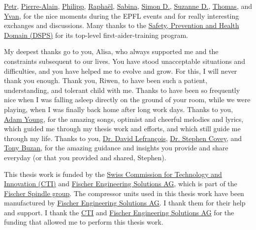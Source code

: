 \href{http://people.epfl.ch/petr.grivaz}{Petr},
\href{https://ch.linkedin.com/pub/pierre-alain-pascal/2a/a58/890/en}{Pierre-Alain},
\href{http://people.epfl.ch/philipp.clausen}{Philipp},
\href{https://ch.linkedin.com/in/rgindrat/en}{Raphaël},
\href{https://ch.linkedin.com/pub/sabina-schneider/b2/2ba/538}{Sabina},
\href{http://people.epfl.ch/simon.doppler}{Simon D.},
\href{https://ch.linkedin.com/pub/suzanne-dubsky/84/a58/555/en}{Suzanne
  D.}, \href{https://sg.linkedin.com/in/thomascibils/en}{Thomas}, and
\href{https://ch.linkedin.com/pub/yvan-deillon/2a/b5a/382/en}{Yvan},
for the nice moments during the EPFL events and for really interesting
exchanges and discussions. Many thanks to the
\href{http://securite.epfl.ch/}{Safety, Prevention and Health Domain
  (DSPS)} for its top-level first-aider-training program.

My deepest thanks go to you, Alisa, who always supported me and the
constraints subsequent to our lives. You have stood unacceptable
situations and difficulties, and you have helped me to evolve and
grow. For this, I will never thank you enough. Thank you, Riwen, to
have been such a patient, understanding, and tolerant child with
me. Thanks to have been so frequently nice when I was falling asleep
directly on the ground of your room, while we were playing, when I was
finally back home after long work days. Thanks to you,
\href{https://en.wikipedia.org/wiki/Adam_Young}{Adam Young}, for the
amazing songs, optimist and cheerful melodies and lyrics, which guided
me through my thesis work and efforts, and which still guide me
through my life. Thanks to you,
\href{https://www.youtube.com/playlist?list=PLIB0FUzmhLoSCRLM2WFt_mz6plvulw6hU}{Dr. David
  Lefrançois},
\href{https://en.wikipedia.org/wiki/Stephen_Covey}{Dr. Stephen Covey},
and \href{https://en.wikipedia.org/wiki/Tony_Buzan}{Tony Buzan}, for
the amazing guidance and insights you provide and share everyday (or
that you provided and shared, Stephen).

This thesis work is funded by the
\href{https://www.kti.admin.ch/kti/en/home.html}{Swiss Commission for
  Technology and Innovation (CTI)} and
\href{http://www.fischerspindle.com/facilities/fischer-engineering-solutions-ag/}{Fischer
  Engineering Solutions AG}, which is part of the \href{http://www.fischerspindle.com/about-us/brands/}{Fischer
  Spindle group}. The compressor units used in this thesis work have
been manufactured by
\href{http://www.fischerspindle.com/facilities/fischer-engineering-solutions-ag/}{Fischer
  Engineering Solutions AG}. I thank them for their help and
support. I thank the
\href{https://www.kti.admin.ch/kti/en/home.html}{CTI} and
\href{http://www.fischerspindle.com/facilities/fischer-engineering-solutions-ag/}{Fischer
  Engineering Solutions AG} for the funding that allowed me to perform
this thesis work.
